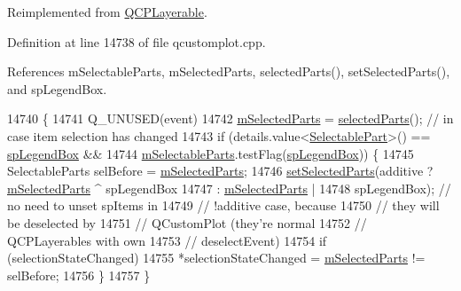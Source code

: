 Reimplemented from \hyperlink{class_q_c_p_layerable_a7498c2d0d081cf7cad0fb3bb93aa0e91}{Q\+C\+P\+Layerable}.



Definition at line 14738 of file qcustomplot.\+cpp.



References m\+Selectable\+Parts, m\+Selected\+Parts, selected\+Parts(), set\+Selected\+Parts(), and sp\+Legend\+Box.


\begin{DoxyCode}
14740                                                          \{
14741   Q\_UNUSED(event)
14742   \hyperlink{class_q_c_p_legend_a917a34dd2856baafd8d56852d94d00e2}{mSelectedParts} = \hyperlink{class_q_c_p_legend_abbbf1b2d6a149013527ed87b0780894a}{selectedParts}(); \textcolor{comment}{// in case item selection has changed}
14743   if (details.value<\hyperlink{class_q_c_p_legend_a5404de8bc1e4a994ca4ae69e2c7072f1}{SelectablePart}>() == \hyperlink{class_q_c_p_legend_a5404de8bc1e4a994ca4ae69e2c7072f1a0fa4758962a46fa1dc9da818abae23c4}{spLegendBox} &&
14744       \hyperlink{class_q_c_p_legend_a179b4d5c1bea723b76e402ff48f0d7fb}{mSelectableParts}.testFlag(\hyperlink{class_q_c_p_legend_a5404de8bc1e4a994ca4ae69e2c7072f1a0fa4758962a46fa1dc9da818abae23c4}{spLegendBox})) \{
14745     SelectableParts selBefore = \hyperlink{class_q_c_p_legend_a917a34dd2856baafd8d56852d94d00e2}{mSelectedParts};
14746     \hyperlink{class_q_c_p_legend_a2aee309bb5c2a794b1987f3fc97f8ad8}{setSelectedParts}(additive ? \hyperlink{class_q_c_p_legend_a917a34dd2856baafd8d56852d94d00e2}{mSelectedParts} ^ spLegendBox
14747                               : \hyperlink{class_q_c_p_legend_a917a34dd2856baafd8d56852d94d00e2}{mSelectedParts} |
14748                                     spLegendBox); \textcolor{comment}{// no need to unset spItems in}
14749                                                   \textcolor{comment}{// !additive case, because}
14750                                                   \textcolor{comment}{// they will be deselected by}
14751                                                   \textcolor{comment}{// QCustomPlot (they're normal}
14752                                                   \textcolor{comment}{// QCPLayerables with own}
14753                                                   \textcolor{comment}{// deselectEvent)}
14754     \textcolor{keywordflow}{if} (selectionStateChanged)
14755       *selectionStateChanged = \hyperlink{class_q_c_p_legend_a917a34dd2856baafd8d56852d94d00e2}{mSelectedParts} != selBefore;
14756   \}
14757 \}
\end{DoxyCode}


